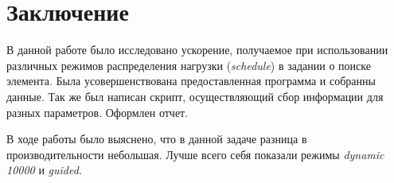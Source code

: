 \documentclass[a4paper, 12pt]{article}
\begin{document}




\section{Заключение}

В данной работе было исследовано ускорение, получаемое при использовании различных режимов распределения нагрузки (\textit{schedule}) в задании о поиске элемента.
Была усовершенствована предоставленная программа и собранны данные.
Так же был написан скрипт, осуществляющий сбор информации для разных параметров.
Оформлен отчет.

В ходе работы было выяснено, что в данной задаче разница в производительности небольшая.
Лучше всего себя показали режимы \textit{dynamic 10000} и \textit{guided}.


\end{document}
